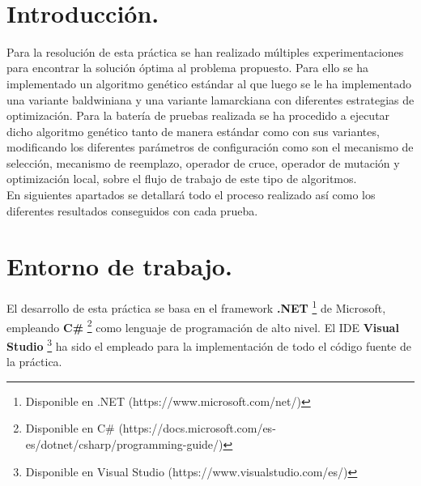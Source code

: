 \documentclass[10pt]{article}
\begin{document}
\begin{center}
 		\\																		%
\vspace{2cm} 																				
\begin{center}																					
 			\end{center}												  						
\end{center}							 											
																					
\newpage																		

\tableofcontents 

\newpage



\section{Introducción.} 
Para la resolución de esta práctica se han realizado múltiples experimentaciones para encontrar la solución óptima al problema propuesto. Para ello se ha implementado un algoritmo genético estándar al que luego se le ha implementado una variante baldwiniana y una variante lamarckiana con diferentes estrategias de optimización. Para la batería de pruebas realizada se ha procedido a ejecutar dicho algoritmo genético tanto de manera estándar como con sus variantes, modificando los diferentes parámetros de configuración como son el mecanismo de selección, mecanismo de reemplazo, operador de cruce, operador de mutación y optimización local, sobre el flujo de trabajo de este tipo de algoritmos.   \\

En siguientes apartados se detallará todo el proceso realizado así como los diferentes resultados conseguidos con cada prueba. 



\section{Entorno de trabajo.} 
El desarrollo de esta práctica se basa en el framework \textbf{.NET} \footnote{Disponible en .NET (https://www.microsoft.com/net/)} de Microsoft, empleando \textbf{C\#} \footnote{Disponible en C\# (https://docs.microsoft.com/es-es/dotnet/csharp/programming-guide/)} como lenguaje de programación de alto nivel. El IDE \textbf{Visual Studio} \footnote{Disponible en Visual Studio (https://www.visualstudio.com/es/)} ha sido el empleado para la implementación de todo el código fuente de la práctica. \\
\end{document}
